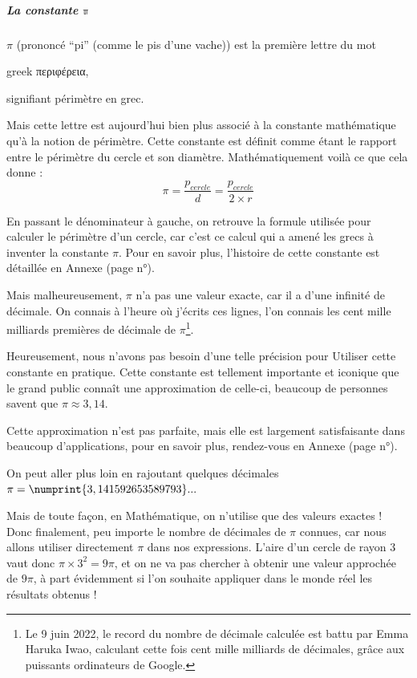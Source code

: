 \documentclass[a4paper, twoside]{article}
\begin{document}
\subparagraph*{La constante $\mathbb{\pi}$}

$\pi$ (prononcé “pi” (comme le pis d'une vache)) est la première lettre du mot
\begin{otherlanguage*}{greek}
	περιφέρεια,
\end{otherlanguage*}
signifiant périmètre en grec.

Mais cette lettre est aujourd'hui bien plus associé à la constante mathématique
qu'à la notion de périmètre.
Cette constante est définit comme étant le rapport entre
le périmètre du cercle et son diamètre. Mathématiquement
voilà ce que cela donne : $$\pi = \frac{p_{cercle}}{d} = \frac{p_{cercle}}{2 \times r}$$

En passant le dénominateur à gauche,
on retrouve la formule utilisée pour calculer le périmètre d'un cercle,
car c'est ce calcul qui a amené les grecs à inventer la constante $\pi$.
Pour en savoir plus, l'histoire de cette constante est détaillée en Annexe (page n°\pageref*{histoire_de_pi}).

\medbreak

Mais malheureusement, $\pi$ n'a pas une valeur exacte,
car il a d'une infinité de décimale. On connais à l'heure où j'écrits ces lignes,
l'on connais les cent mille milliards premières de décimale de $\pi$\footnote{
	Le 9 juin 2022, le record du nombre de décimale calculée est battu par Emma Haruka Iwao,
	calculant cette fois cent mille milliards de décimales,
	grâce aux puissants ordinateurs de Google.}.%

Heureusement, nous n'avons pas besoin d'une telle précision pour
Utiliser cette constante en pratique. Cette constante est tellement importante
et iconique que le grand public connaît une approximation de celle-ci,
beaucoup de personnes savent que $\pi \approx 3,14$.

Cette approximation n'est pas parfaite, mais elle est largement
satisfaisante dans beaucoup d'applications, pour en savoir plus, rendez-vous en Annexe (page n°\pageref*{approximations_pi}).

On peut aller plus loin en rajoutant quelques décimales $\pi = \numprint{3,141592653589793}...$

\medbreak

Mais de toute façon, en Mathématique, on n'utilise que des valeurs exactes !
Donc finalement, peu importe le nombre de décimales de $\pi$ connues, car nous allons utiliser
directement $\pi$ dans nos expressions. L'aire d'un cercle de rayon 3 vaut donc $\pi \times 3^2 = 9 \pi$, et
on ne va pas chercher à obtenir une valeur approchée de $9 \pi$, à part évidemment si
l'on souhaite appliquer dans le monde réel les résultats obtenus !
\end{document}
